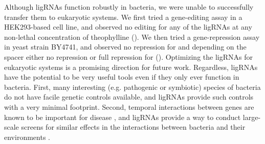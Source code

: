 \documentclass[10pt,oneside]{article}
\begin{document}
% 
% 
Although ligRNAs function robustly in bacteria, we were unable to successfully transfer them to eukaryotic systems.  We first tried a gene-editing assay in a HEK293-based cell line, and observed no editing for any of the ligRNAs at any non-lethal concentration of theophylline ().  We then tried a gene-repression assay in yeast strain BY4741, and observed no repression for \ligrnaF{} and depending on the spacer either no repression or full repression for \ligrnaB{} ().  Optimizing the ligRNAs for eukaryotic systems is a promising direction for future work.  Regardless, ligRNAs have the potential to be very useful tools even if they only ever function in bacteria.  First, many interesting (e.g. pathogenic or symbiotic) species of bacteria do not have facile genetic controls available, and ligRNAs provide such controls with a very minimal footprint.  Second, temporal interactions between genes are known to be important for disease \autocite{lee2012}, and ligRNAs provide a way to conduct large-scale screens for similar effects in the interactions between bacteria and their environments \autocite{peters2016}.
% 
% 
% 
%

\end{document}
